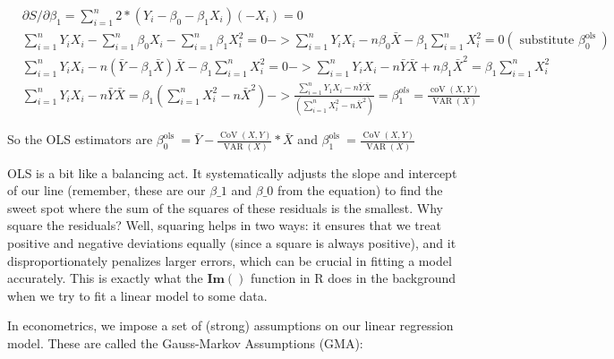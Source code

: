 \documentclass[10pt]{article}
\begin{document}
$$
\begin{aligned}
& \partial S / \partial \beta_{1}=\sum_{i=1}^{n} 2 *\left(Y_{i}-\beta_{0}-\beta_{1} X_{i}\right)\left(-X_{i}\right)=0 \\
& \sum_{i=1}^{n} Y_{i} X_{i}-\sum_{i=1}^{n} \beta_{0} X_{i}-\sum_{i=1}^{n} \beta_{1} X_{i}^{2}=0->\sum_{i=1}^{n} Y_{i} X_{i}-n \beta_{0} \bar{X}-\beta_{1} \sum_{i=1}^{n} X_{i}^{2}=0\left(\text { substitute } \beta_{0}^{\text {ols }}\right) \\
& \sum_{i=1}^{n} Y_{i} X_{i}-n\left(\bar{Y}-\beta_{1} \bar{X}\right) \bar{X}-\beta_{1} \sum_{i=1}^{n} X_{i}^{2}=0->\sum_{i=1}^{n} Y_{i} X_{i}-n \bar{Y} \bar{X}+n \beta_{1} \bar{X}^{2}=\beta_{1} \sum_{i=1}^{n} X_{i}^{2} \\
& \sum_{i=1}^{n} Y_{i} X_{i}-n \bar{Y} \bar{X}=\beta_{1}\left(\sum_{i=1}^{n} X_{i}^{2}-n \bar{X}^{2}\right)->\frac{\sum_{i=1}^{n} Y_{1} X_{i}-n \bar{Y} \bar{X}}{\left(\sum_{i=1}^{n} X_{i}^{2}-n \bar{X}^{2}\right)}=\beta_{1}^{o l s}=\frac{\operatorname{coV}(X, Y)}{\operatorname{VAR}(X)}
\end{aligned}
$$

So the OLS estimators are $\beta_{0}^{\text {ols }}=\bar{Y}-\frac{\operatorname{CoV}(X, Y)}{\operatorname{VAR}(X)} * \bar{X}$ and $\beta_{1}^{\text {ols }}=\frac{\operatorname{CoV}(X, Y)}{\operatorname{VAR}(X)}$

OLS is a bit like a balancing act. It systematically adjusts the slope and intercept of our line (remember, these are our $\beta \_1$ and $\beta \_0$ from the equation) to find the sweet spot where the sum of the squares of these residuals is the smallest. Why square the residuals? Well, squaring helps in two ways: it ensures that we treat positive and negative deviations equally (since a square is always positive), and it disproportionately penalizes larger errors, which can be crucial in fitting a model accurately. This is exactly what the $\boldsymbol{I m}()$ function in R does in the background when we try to fit a linear model to some data.

In econometrics, we impose a set of (strong) assumptions on our linear regression model. These are called the Gauss-Markov Assumptions (GMA):
\end{document}
